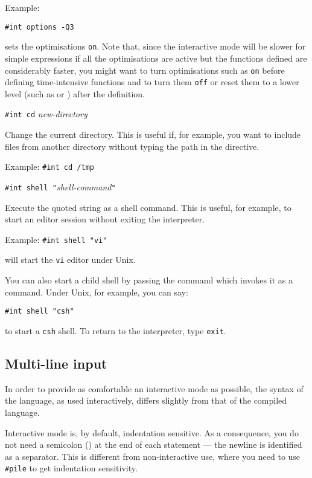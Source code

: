 Example:

\verb"#int options -Q3"

sets the optimisations \verb"on". Note that, since the interactive mode
will be slower for simple expressions if all the optimisations are
active but the functions defined are considerably faster, you might want
to turn optimisations such as  \verb"on" before defining
time-intensive functions and to turn them \verb"off" or reset them to a
lower level (such as  or ) after the definition.

\mysubsect{} \verb"#int cd" {\it new-directory}

Change the current directory. This is useful if, for example,
you want to include files from another directory without
typing the path in the  directive.

Example: \verb"#int cd /tmp"

\mysubsect{} \verb'#int shell "'{\it shell-command}\verb'"'

Execute the quoted string as a shell command. This is useful, for
example, to start an editor session  without exiting the interpreter.

Example: \verb'#int shell "vi"'

will  start the \verb"vi" editor under Unix.

You can also start a child shell by passing the command which invokes
it as a command.
Under Unix, for example, you can say:

\verb'#int shell "csh"'

to start a \verb"csh" shell. To return to the interpreter,
type \verb"exit".

        

\subsection{Multi-line input}

In order to provide as comfortable an interactive mode as possible,
the syntax of the \asharp{} language, as used interactively, differs
slightly from that of the compiled language.

Interactive mode is, by default, indentation sensitive.
As a consequence, you do not need a semicolon (\ttin{;}) at the end of
each statement --- the newline is identified as a separator.
This is different from non-interactive use, where you need
to use \verb"#pile" to get indentation sensitivity.

